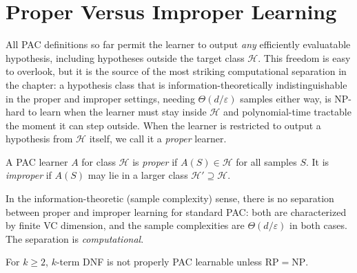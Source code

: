 
\section{Proper Versus Improper Learning}
\label{sec:proper-improper}

All PAC definitions so far permit the learner to output \emph{any}
efficiently evaluatable hypothesis, including hypotheses outside the target
class $\mathcal{H}$.  This freedom is easy to overlook, but it is the source of the
most striking computational separation in the chapter: a hypothesis class that
is information-theoretically indistinguishable in the proper and improper
settings, needing $\Theta(d/\varepsilon)$ samples either way, is NP-hard to
learn when the learner must stay inside $\mathcal{H}$ and polynomial-time
tractable the moment it can step outside.  When the learner is restricted to
output a hypothesis from $\mathcal{H}$ itself, we call it a \emph{proper}
learner.

\begin{defn}
\label{def:proper-improper-ext}
A PAC learner $A$ for class $\mathcal{H}$ is \emph{proper} if
$A(S) \in \mathcal{H}$ for all samples $S$.  It is \emph{improper} if
$A(S)$ may lie in a larger class $\mathcal{H}' \supseteq \mathcal{H}$.
\end{defn}

\begin{remark}
In the information-theoretic (sample complexity) sense, there is no
separation between proper and improper learning for standard PAC: both are
characterized by finite VC dimension, and the sample complexities are
$\Theta(d/\varepsilon)$ in both cases.  The separation is \emph{computational}.
\end{remark}

\begin{thm}
\label{thm:pitt-valiant}
For $k \geq 2$, $k$-term DNF is not properly PAC learnable unless $\mathrm{RP} = \mathrm{NP}$.
\end{thm}

